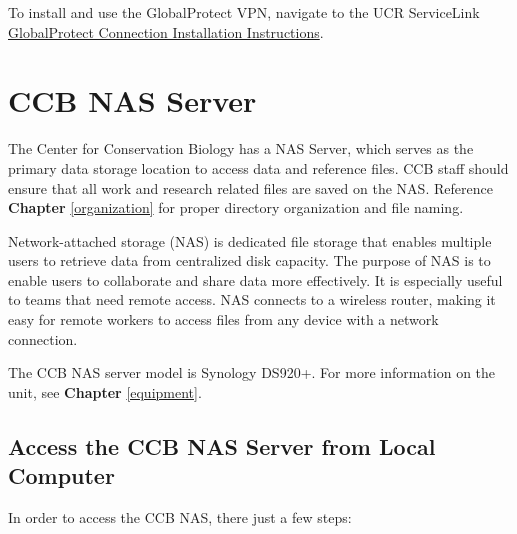 \documentclass[
]{book}
\begin{document}
To install and use the GlobalProtect VPN, navigate to the UCR ServiceLink \href{https://ucrsupport.service-now.com/ucr_portal/?id=kb_article\&sys_id=8a264d791b5f0c149c0b844fdd4bcb34}{GlobalProtect Connection Installation Instructions}.

\hypertarget{ccb-nas-server}{%
\section{CCB NAS Server}\label{ccb-nas-server}}

The Center for Conservation Biology has a NAS Server, which serves as the primary data storage location to access data and reference files. CCB staff should ensure that all work and research related files are saved on the NAS. Reference \textbf{Chapter} \ref{organization} for proper directory organization and file naming.

Network-attached storage (NAS) is dedicated file storage that enables multiple users to retrieve data from centralized disk capacity. The purpose of NAS is to enable users to collaborate and share data more effectively. It is especially useful to teams that need remote access. NAS connects to a wireless router, making it easy for remote workers to access files from any device with a network connection.

The CCB NAS server model is Synology DS920+. For more information on the unit, see \textbf{Chapter} \ref{equipment}.

\hypertarget{access-the-ccb-nas-server-from-local-computer}{%
\subsection{Access the CCB NAS Server from Local Computer}\label{access-the-ccb-nas-server-from-local-computer}}

In order to access the CCB NAS, there just a few steps:
\end{document}
